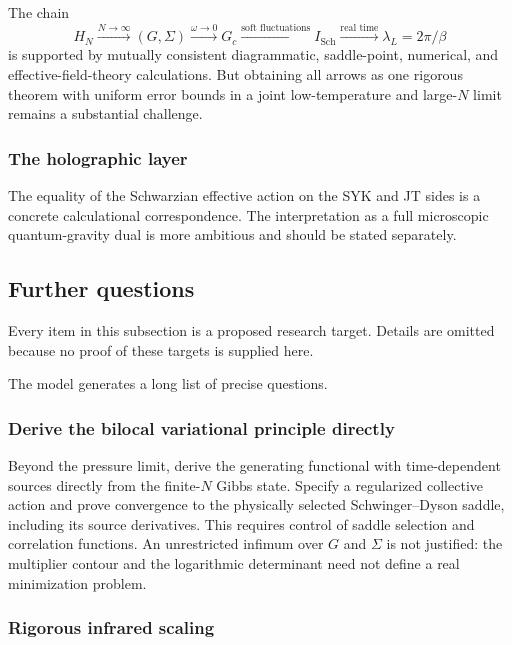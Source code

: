 \documentclass[11pt]{article}
\numberwithin{equation}{section}
\theoremstyle{exposition}
\theoremstyle{result}
\newcommand{\Sch}{\mathrm{Sch}}
\begin{document}
The chain
\begin{equation*}
H_N
\xrightarrow{N\to\infty}
(G,\Sigma)
\xrightarrow{\omega\to0}
G_c
\xrightarrow{\text{soft fluctuations}}
I_{\Sch}
\xrightarrow{\text{real time}}
\lambda_L=2\pi/\beta
\end{equation*}
is supported by mutually consistent diagrammatic, saddle-point, numerical, and effective-field-theory calculations. But obtaining all arrows as one rigorous theorem with uniform error bounds in a joint low-temperature and large-$N$ limit remains a substantial challenge.

\subsubsection{The holographic layer}

The equality of the Schwarzian effective action on the SYK and JT sides is a concrete calculational correspondence. The interpretation as a full microscopic quantum-gravity dual is more ambitious and should be stated separately.

\subsection{Further questions}

Every item in this subsection is a proposed research target. Details are omitted because no proof of these targets is supplied here.

The model generates a long list of precise questions.

\subsubsection{Derive the bilocal variational principle directly}

Beyond the pressure limit, derive the generating functional with time-dependent sources directly from the finite-$N$ Gibbs state. Specify a regularized collective action and prove convergence to the physically selected Schwinger--Dyson saddle, including its source derivatives. This requires control of saddle selection and correlation functions. An unrestricted infimum over $G$ and $\Sigma$ is not justified: the multiplier contour and the logarithmic determinant need not define a real minimization problem.

\subsubsection{Rigorous infrared scaling}
\end{document}
